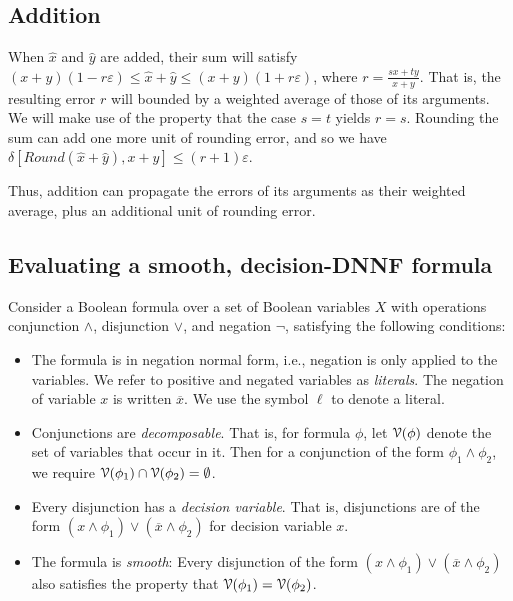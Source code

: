 \documentclass[letterpaper,USenglish,cleveref, autoref, thm-restate]{lipics-v2021}
\newcommand{\obar}[1]{\overline{#1}}
\newcommand{\lit}{\ell}
\newcommand{\approximate}[1]{\hat{#1}}
\newcommand{\approxx}{\approximate{x}}
\newcommand{\approxy}{\approximate{y}}
\newcommand{\round}{\mathit{Round}}
\newcommand{\aerror}{\delta}
\newcommand{\roundepsilon}{\varepsilon}
\newcommand{\varset}{X}
\newcommand{\dependencyset}{{\cal V}}
\begin{document}
\subsection{Addition}

When $\approxx$ and $\approxy$ are added, their sum will satisfy
$(x + y) (1 - r\roundepsilon) \leq \approxx + \approxy \leq (x + y) (1 + r\roundepsilon)$, where $r = \frac{sx + ty}{x+y}$.  That is, the resulting error $r$ will bounded by a weighted average
of those of its arguments.  We will make use of the property that the case $s=t$ yields $r=s$.
Rounding the sum can add one more unit of rounding error, and so we have
$\aerror[\round(\approxx + \approxy), x + y] \leq (r+1)\roundepsilon$.

Thus, addition can propagate the errors of its arguments as their weighted average, plus an additional unit of rounding error.

\subsection{Evaluating a smooth, decision-DNNF formula}

Consider a Boolean formula over a set of Boolean variables $\varset$
with operations conjunction $\land$, disjunction $\lor$, and negation
$\neg$, satisfying the following conditions:
\begin{itemize}
\item The formula is in negation normal form, i.e., negation is only
  applied to the variables.  We refer to positive and negated
  variables as \emph{literals}.  The negation of variable $x$ is
  written $\obar{x}$. We use the symbol $\lit$ to denote a literal.
\item Conjunctions are \emph{decomposable}.  That is, for formula $\phi$, let $\dependencyset(\phi)$ denote the set of variables that occur in it.  Then for a conjunction of the form
  $\phi_1 \land \phi_2$, we require $\dependencyset(\phi_1) \cap \dependencyset(\phi_2) = \emptyset$.
\item Every disjunction has a \emph{decision variable}.  That is, disjunctions are of the form $(x \land \phi_1) \lor (\obar{x} \land \phi_2)$ for decision variable $x$. 
\item The formula is \emph{smooth}: Every disjunction of the form $(x \land \phi_1) \lor (\obar{x} \land \phi_2)$ 
also satisfies the property that $\dependencyset(\phi_1) = \dependencyset(\phi_2)$.
\end{itemize}
\end{document}
